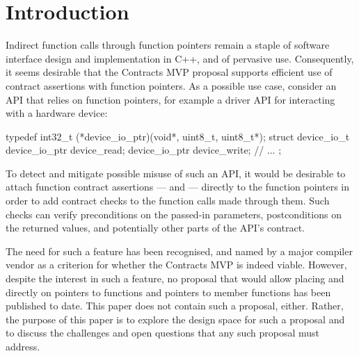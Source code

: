 
\tableofcontents*
\pagebreak





\section{Introduction}
\label{intro}

Indirect function calls through function pointers remain a staple of software interface design and implementation in C++, and of pervasive use. Consequently, it seems desirable that the Contracts MVP proposal \cite{P2900R8} supports efficient use of contract assertions with function pointers. As a possible use case, consider an API that relies on function pointers, for example a driver API for interacting with a hardware device:
\begin{codeblock}
typedef int32_t (*device_io_ptr)(void*, uint8_t, uint8_t*);
struct device_io_t {
  device_io_ptr device_read;
  device_io_ptr device_write;
  // ...
};
\end{codeblock}
To detect and mitigate possible misuse of such an API, it would be desirable to attach function contract assertions ---  and  --- directly to the function pointers in order to add contract checks to the function calls made through them. Such checks can verify preconditions on the passed-in parameters, postconditions on the returned values, and potentially other parts of the API's contract.

The need for such a feature has been recognised, and named by a major compiler vendor as a criterion for whether the Contracts MVP is indeed viable. However, despite the interest in such a feature, no proposal that would allow placing  and  directly on pointers to functions and pointers to member functions has been published to date. This paper does not contain such a proposal, either. Rather, the purpose of this paper is to explore the design space for such a proposal and to discuss the challenges and open questions that any such proposal must address.

